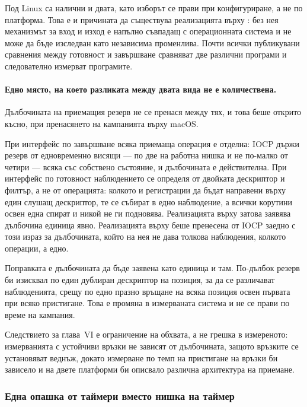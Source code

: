 Под Linux са налични и двата, като изборът се прави при конфигуриране, а не по платформа.
Това е и причината да съществува реализацията върху : без нея механизмът за вход
и изход е напълно съвпадащ с операционната система и не може да бъде изследван като
независима променлива. Почти всички публикувани сравнения между готовност и завършване
сравняват две различни програми и следователно измерват програмите.

\paragraph{Едно място, на което разликата между двата вида не е количествена.} Дълбочината
на приемащия резерв не се пренася между тях, и това беше открито късно, при пренасянето на
кампанията върху macOS.

При интерфейс по завършване всяка приемаща операция е отделна: IOCP държи резерв от
едновременно висящи  — по две на работна нишка и не по-малко от четири —
всяка със собствено състояние, и дълбочината е действителна. При интерфейс по готовност
наблюдението се определя от двойката дескриптор и филтър, а не от операцията: колкото и
регистрации да бъдат направени върху един слушащ дескриптор, те се събират в едно
наблюдение, а всички корутини освен една спират и никой не ги подновява. Реализацията върху
 затова заявява дълбочина единица явно. Реализацията върху  беше
пренесена от IOCP заедно с този израз за дълбочината, който на нея не дава толкова
наблюдения, колкото операции, а едно.

Поправката е дълбочината да бъде заявена като единица и там. По-дълбок резерв би изисквал по
един дублиран дескриптор на позиция, за да се различават наблюденията, срещу по едно празно
връщане на всяка позиция освен първата при всяко пристигане. Това е промяна в измерваната система и не се прави по
време на кампания.

Следствието за глава~VI е ограничение на обхвата, а не грешка в измереното: измерванията с
устойчиви връзки не зависят от дълбочината, защото връзките се установяват веднъж, докато
измерване по темп на пристигане на връзки би зависело и на двете платформи би описвало
различна архитектура на приемане.

\subsubsection{Една опашка от таймери вместо нишка на таймер}

